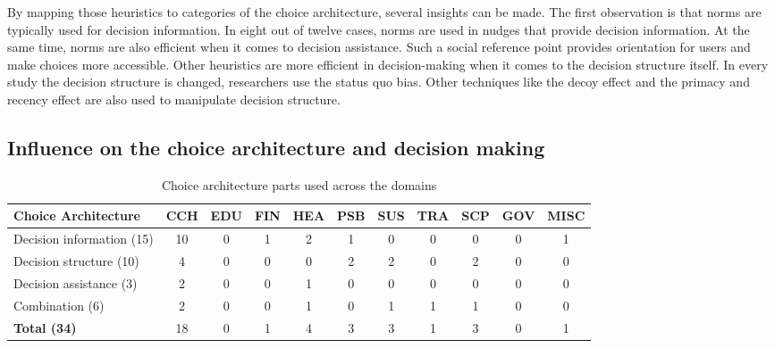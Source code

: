 By mapping those heuristics to categories of the choice architecture, several insights can be made. The first observation is that norms are typically used for decision information. In eight out of twelve cases, norms are used in nudges that provide decision information. At the same time, norms are also efficient when it comes to decision assistance. Such a social reference point provides orientation for users and make choices more accessible. 
Other heuristics are more efficient in decision-making when it comes to the decision structure itself. In every study the decision structure is changed, researchers use the status quo bias.
Other techniques like the decoy effect and the primacy and recency effect are also used to manipulate decision structure.



\subsection{Influence on the choice architecture and decision making}


\begin{table}[htbp]
\centering
\small
\begin{tabular}{|p{}|cccccccccc|}
\hline
\textbf{Choice Architecture} & \textbf{CCH} & \textbf{EDU} & \textbf{FIN} & \textbf{HEA} & \textbf{PSB} & \textbf{SUS} & \textbf{TRA} & \textbf{SCP} & \textbf{GOV} & \textbf{MISC} \\ \hline
Decision information (15) & 10 & 0 & 1 & 2 & 1 & 0 & 0 & 0 & 0 & 1 \\
Decision structure (10) & 4 & 0 & 0 & 0 & 2 & 2 & 0 & 2 & 0 & 0 \\
Decision assistance (3) & 2 & 0 & 0 & 1 & 0 & 0 & 0 & 0 & 0 & 0 \\
Combination (6) & 2 & 0 & 0 & 1 & 0 & 1 & 1 & 1 & 0 & 0 \\ \hline
\textbf{Total (34)} & 18 & 0 & 1 & 4 & 3 & 3 & 1 & 3 & 0 & 1 \\ \hline
\end{tabular}
\caption{Choice architecture parts used across the domains}
\label{tabel:choice-arch-domains}
\end{table}

